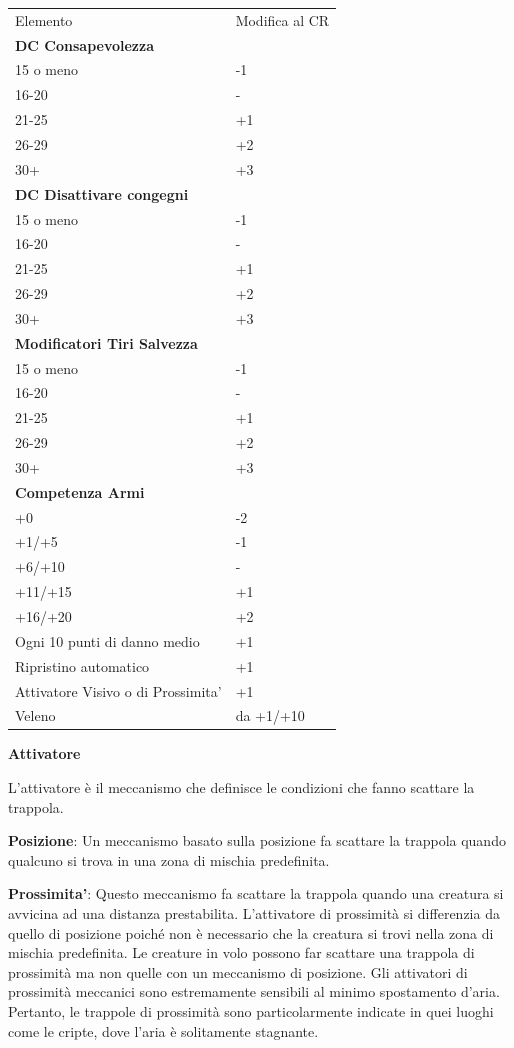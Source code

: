 \documentclass[a4paper,11pt,twoside,openany]{book}
\begin{document}
\begin{tabular}{ll}
	\toprule
	Elemento   & Modifica al CR\\
	\textbf{DC Consapevolezza}& \\
	15 o meno  & -1   \\
	16-20 & -    \\
	21-25 & +1   \\
	26-29 & +2   \\
	30+   & +3   \\
	\textbf{DC Disattivare congegni}
	 & \\
	15 o meno  & -1   \\
	16-20 & -    \\
	21-25 & +1   \\
	26-29 & +2   \\
	30+   & +3   \\
	\textbf{Modificatori Tiri Salvezza} & \\
	15 o meno  & -1   \\
	16-20 & -    \\
	21-25 & +1   \\
	26-29 & +2   \\
	30+   & +3   \\
	\textbf{Competenza Armi}  & \\
	+0    & -2   \\
	+1/+5 & -1   \\
	+6/+10& -    \\
	+11/+15    & +1   \\
	+16/+20    & +2   \\

	Ogni 10 punti di danno medio   & +1   \\
	Ripristino automatico& +1   \\
	Attivatore Visivo o di Prossimita’  & +1   \\
	Veleno& da +1/+10 \\
\end{tabular}

\bigskip

\textbf{Attivatore}

L'attivatore è il meccanismo che definisce le condizioni che fanno scattare la trappola.

\textbf{Posizione}: Un meccanismo basato sulla posizione fa scattare la trappola quando qualcuno si trova in una zona di mischia predefinita.

\textbf{Prossimita'}: Questo meccanismo fa scattare la trappola quando una creatura si avvicina ad una distanza prestabilita. L'attivatore di prossimità si differenzia da quello di posizione poiché non è necessario che la creatura si trovi nella zona di mischia predefinita. Le creature in volo possono far scattare una trappola di prossimità ma non quelle con un meccanismo di posizione. Gli attivatori di prossimità meccanici sono estremamente sensibili al minimo spostamento d'aria. Pertanto, le trappole di prossimità sono particolarmente indicate in quei luoghi come le cripte, dove l'aria è solitamente stagnante.
\end{document}
